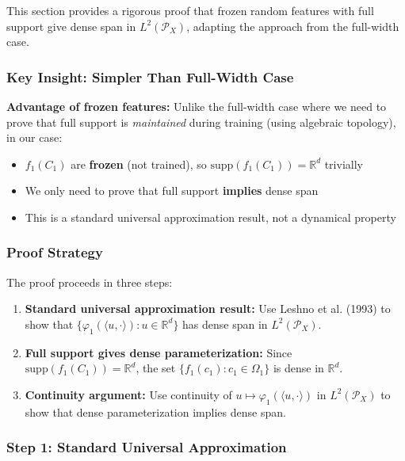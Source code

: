 \documentclass[11pt]{article}
\newcommand{\1}{\mathbbm{1}}
\begin{document}
This section provides a rigorous proof that frozen random features with full support give dense span in $L^2(\mathcal{P}_X)$, adapting the approach from the full-width case.

\subsubsection{Key Insight: Simpler Than Full-Width Case}

\textbf{Advantage of frozen features:} Unlike the full-width case where we need to prove that full support is \emph{maintained} during training (using algebraic topology), in our case:
\begin{itemize}
\item $f_1(C_1)$ are \textbf{frozen} (not trained), so $\text{supp}(f_1(C_1)) = \mathbb{R}^d$ trivially
\item We only need to prove that full support \textbf{implies} dense span
\item This is a standard universal approximation result, not a dynamical property
\end{itemize}

\subsubsection{Proof Strategy}

The proof proceeds in three steps:

\begin{enumerate}
\item \textbf{Standard universal approximation result:} Use Leshno et al. (1993) to show that $\{\varphi_1(\langle u, \cdot\rangle) : u \in \mathbb{R}^d\}$ has dense span in $L^2(\mathcal{P}_X)$.

\item \textbf{Full support gives dense parameterization:} Since $\text{supp}(f_1(C_1)) = \mathbb{R}^d$, the set $\{f_1(c_1) : c_1 \in \Omega_1\}$ is dense in $\mathbb{R}^d$.

\item \textbf{Continuity argument:} Use continuity of $u \mapsto \varphi_1(\langle u, \cdot\rangle)$ in $L^2(\mathcal{P}_X)$ to show that dense parameterization implies dense span.
\end{enumerate}

\subsubsection{Step 1: Standard Universal Approximation}
\end{document}
